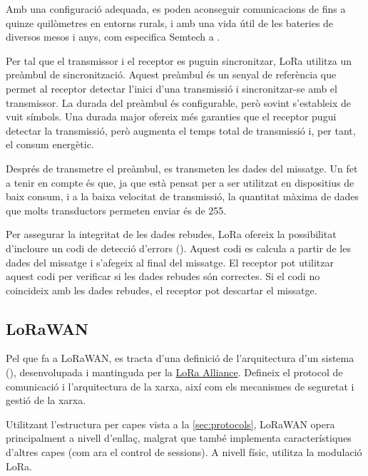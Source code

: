 \documentclass{tfgitic}[2024/07/01]
\begin{document}
Amb una configuració adequada, es poden aconseguir comunicacions de fins a quinze quilòmetres en entorns rurals, i amb una vida útil de les bateries de diversos mesos i anys, com especifica Semtech a \cite{noauthor_lora_2024}.

Per tal que el transmissor i el receptor es puguin sincronitzar, LoRa utilitza un preàmbul de sincronització. Aquest preàmbul és un senyal de referència que permet al receptor detectar l'inici d'una transmissió i sincronitzar-se amb el transmissor. La durada del preàmbul és configurable, però sovint s'estableix de vuit símbols. Una durada major ofereix més garanties que el receptor pugui detectar la transmissió, però augmenta el temps total de transmissió i, per tant, el consum energètic.

Després de transmetre el preàmbul, es transmeten les dades del missatge. Un fet a tenir en compte és que, ja que està pensat per a ser utilitzat en dispositius de baix consum, i a la baixa velocitat de transmissió, la quantitat màxima de dades que molts transductors permeten enviar és de \SI{255}{\byte}.

Per assegurar la integritat de les dades rebudes, LoRa ofereix la possibilitat d'incloure un codi de detecció d'errors (). Aquest codi es calcula a partir de les dades del missatge i s'afegeix al final del missatge. El receptor pot utilitzar aquest codi per verificar si les dades rebudes són correctes. Si el codi no coincideix amb les dades rebudes, el receptor pot descartar el missatge.


\subsection{LoRaWAN}
Pel que fa a LoRaWAN, es tracta d'una definició de l'arquitectura d'un sistema  (), desenvolupada i mantinguda per la \href{https://lora-alliance.org}{LoRa Alliance}. Defineix el protocol de comunicació i l'arquitectura de la xarxa, així com els mecanismes de seguretat i gestió de la xarxa. 

Utilitzant l'estructura per capes vista a la \autoref{sec:protocols}, LoRaWAN opera principalment a nivell d'enllaç, malgrat que també implementa característiques d'altres capes (com ara el control de sessions). A nivell físic, utilitza la modulació LoRa.
\end{document}
